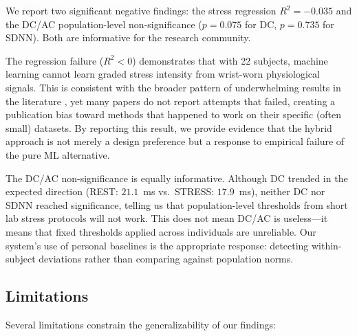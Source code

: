 \documentclass[12pt,letterpaper]{article}
\begin{document}
We report two significant negative findings: the stress regression $R^2 = -0.035$ and the DC/AC population-level non-significance ($p = 0.075$ for DC, $p = 0.735$ for SDNN). Both are informative for the research community.

The regression failure ($R^2 < 0$) demonstrates that with 22 subjects, machine learning cannot learn graded stress intensity from wrist-worn physiological signals. This is consistent with the broader pattern of underwhelming results in the literature \citep{velmovitsky2022smartwatch, bahameish2022stress}, yet many papers do not report attempts that failed, creating a publication bias toward methods that happened to work on their specific (often small) datasets. By reporting this result, we provide evidence that the hybrid approach is not merely a design preference but a response to empirical failure of the pure ML alternative.

The DC/AC non-significance is equally informative. Although DC trended in the expected direction (REST: $21.1$~ms vs.\ STRESS: $17.9$~ms), neither DC nor SDNN reached significance, telling us that population-level thresholds from short lab stress protocols will not work. This does not mean DC/AC is useless---it means that fixed thresholds applied across individuals are unreliable. Our system's use of personal baselines is the appropriate response: detecting within-subject deviations rather than comparing against population norms.

\subsection{Limitations}

Several limitations constrain the generalizability of our findings:
\end{document}
